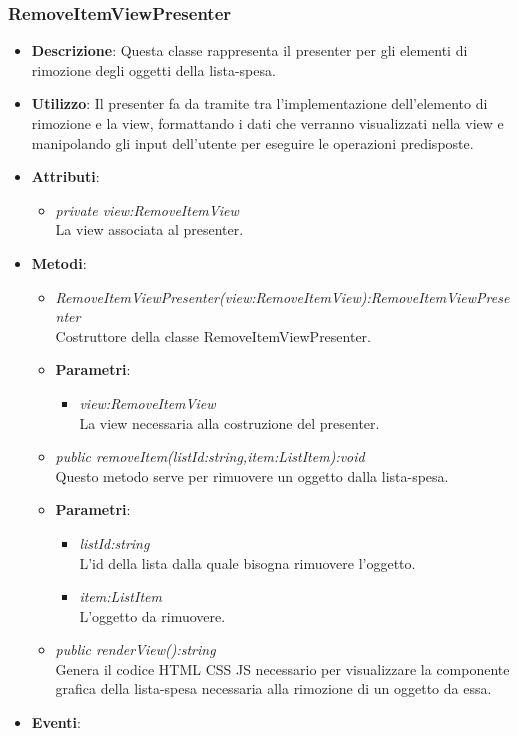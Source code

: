 \subsubsection{RemoveItemViewPresenter}
\begin{itemize}
\item \textbf{Descrizione}: Questa classe rappresenta il presenter per gli elementi di rimozione degli oggetti  della lista-spesa.
\item \textbf{Utilizzo}: Il presenter fa da tramite tra l'implementazione dell'elemento di rimozione e la view, formattando i dati che verranno visualizzati nella view e manipolando gli input dell'utente per eseguire le operazioni predisposte.
\item \textbf{Attributi}: 
	\begin{itemize}
	\item \textit{private view:RemoveItemView}\\
	La view associata al presenter.
	\end{itemize}
\item \textbf{Metodi}:
	\begin{itemize}
	\item \textit{RemoveItemViewPresenter(view:RemoveItemView):RemoveItemViewPresenter}\\
	Costruttore della classe RemoveItemViewPresenter.
			\item{\textbf{Parametri}: \begin{itemize}
			\item \textit{view:RemoveItemView}\\
			La view necessaria alla costruzione del presenter.
			\end{itemize}}
	\item \textit{public removeItem(listId:string,item:ListItem):void}\\
	Questo metodo serve per rimuovere un oggetto dalla lista-spesa.
			\item{\textbf{Parametri}: \begin{itemize}
			\item \textit{listId:string}\\
			L'id della lista dalla quale bisogna rimuovere l'oggetto.
			\item \textit{item:ListItem}\\
			L'oggetto da rimuovere.
			\end{itemize}}
	\item \textit{public renderView():string}\\
	Genera il codice HTML CSS JS necessario per visualizzare la componente grafica della lista-spesa necessaria alla rimozione di un oggetto da essa.
	\end{itemize}
\item \textbf{Eventi}:
\end{itemize}

